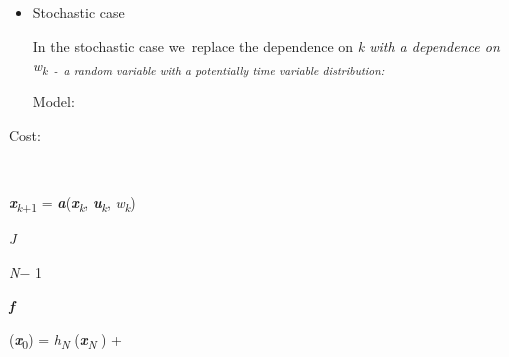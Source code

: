 \documentclass[12pt,twoside]{article}
\begin{document}
\vspace{\baselineskip}
\begin{itemize}
	\item Stochastic case\par


\vspace{\baselineskip}
{\fontsize{10pt}{12.0pt}\selectfont In the stochastic case we\  replace the dependence on \textit{k with a dependence on w\textsubscript{k\  -\ a random variable with  a potentially time variable distribution:}}\par}\par

{\fontsize{10pt}{12.0pt}\selectfont Model:\par}\par


\vspace{\baselineskip}

\end{itemize}
\vspace{\baselineskip}

\vspace{\baselineskip}
{\fontsize{10pt}{12.0pt}\selectfont Cost:\par}\par

\begin{FlushLeft}
\\
{\fontsize{10pt}{12.0pt}\selectfont \textbf{\textit{x}}\textit{\textsubscript{k}}\textsubscript{+1} = \textbf{\textit{a}}(\textbf{\textit{x}}\textit{\textsubscript{k}}, \textbf{\textit{u}}\textit{\textsubscript{k}}, \textit{w\textsubscript{k}})\par}
\end{FlushLeft}\par


\vspace{\baselineskip}
\begin{FlushLeft}
{\fontsize{10pt}{12.0pt}\selectfont \textit{J \tabto{1.28in} }{\fontsize{7pt}{8.4pt}\selectfont \textit{N}$-$ 1\par}\par}
\end{FlushLeft}\par


\vspace{\baselineskip}
\begin{FlushLeft}
{\fontsize{7pt}{8.4pt}\selectfont \textbf{\textit{f }}{\fontsize{10pt}{12.0pt}\selectfont (\textbf{\textit{x}}\textsubscript{0}) = \textit{h\textsubscript{N} }(\textbf{\textit{x}}\textit{\textsubscript{N} }) +\par}\par}
\end{FlushLeft}\par
\end{document}
